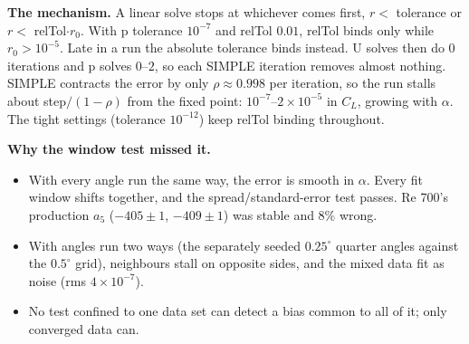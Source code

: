 \documentclass[11pt,a4paper]{article}
\newcommand{\CL}{C_L}
\begin{document}
\textbf{The mechanism.} A linear solve stops at whichever comes first, $r <$ tolerance or $r <$
relTol$\cdot r_0$. With p tolerance $10^{-7}$ and relTol $0.01$, relTol binds only while
$r_0 > 10^{-5}$. Late in a run the absolute tolerance binds instead. U solves then do $0$ iterations and p
solves $0$--$2$, so each SIMPLE iteration removes almost nothing. SIMPLE contracts the error by only
$\rho\approx0.998$ per iteration, so the run stalls about step$/(1-\rho)$ from the fixed point:
$10^{-7}$--$2\times10^{-5}$ in $\CL$, growing with $\alpha$. The tight settings (tolerance $10^{-12}$) keep
relTol binding throughout.

\textbf{Why the window test missed it.}
\begin{itemize}[leftmargin=*]
\item With every angle run the same way, the error is smooth in $\alpha$. Every fit window shifts together,
  and the spread/standard-error test passes. Re 700's production $a_5$ ($-405\pm1$, $-409\pm1$) was stable
  and $8\%$ wrong.
\item With angles run two ways (the separately seeded $0.25^\circ$ quarter angles against the $0.5^\circ$
  grid), neighbours stall on opposite sides, and the mixed data fit as noise (rms $4\times10^{-7}$).
\item No test confined to one data set can detect a bias common to all of it; only converged data can.
\end{itemize}

\begin{center}\small
{}
\end{center}
\end{document}
